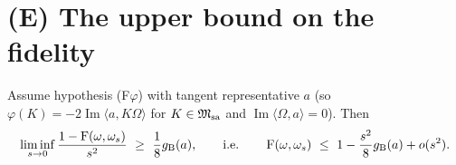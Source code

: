 \documentclass[11pt]{article}
\newcommand{\Om}{\Omega}
\newcommand{\Msa}{\cM_{\mathrm{sa}}}
\newcommand{\gB}{g_{\mathrm B}}
\newcommand{\ip}[2]{\langle #1,#2\rangle}
\begin{document}
\section{(E) The upper bound on the fidelity}\label{sec:upper}

\begin{theorem}\label{thm:upper}
Assume hypothesis \textup{(F$\varphi$)} with tangent representative $a$ \textup{(}so
$\varphi(K)=-2\operatorname{Im}\ip a{K\Om}$ for $K\in\Msa$ and $\operatorname{Im}\ip\Om a=0$\textup{)}.  Then
\begin{equation}\label{eq:upper}
 \liminf_{s\to0}\frac{1-\Fid(\omega,\omega_s)}{s^2}\ \ge\ \frac18\gB(a),
 \qquad\text{i.e.}\qquad \Fid(\omega,\omega_s)\ \le\ 1-\frac{s^2}{8}\gB(a)+o(s^2).
\end{equation}
\end{theorem}
\end{document}
